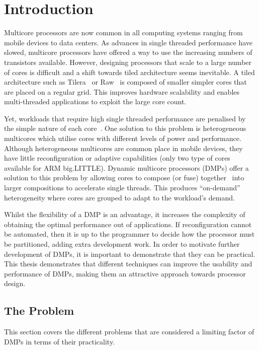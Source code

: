 \chapter{Introduction}
Multicore processors are now common in all computing systems ranging from mobile devices to data centers.
As advances in single threaded performance have slowed, multicore processors have offered a way to use the increasing numbers of transistors available.
However, designing processors that scale to a large number of cores is difficult and a shift towards tiled architecture seems inevitable.
A tiled architecture such as Tilera~\cite{bell2008tile} or Raw~\cite{waingold1997raw} is composed of smaller simpler cores that are placed on a regular grid.
This improves hardware scalability and enables multi-threaded applications to exploit the large core count.

Yet, workloads that require high single threaded performance are penalised by the simple nature of each core~\cite{eyerman2010amdahl}.
One solution to this problem is heterogeneous multicores which utilise cores with different levels of power and performance.
Although heterogeneous multicores are common place in mobile devices, they have little reconfiguration or adaptive capabilities (\eg only two type of cores available for ARM big.LITTLE).
Dynamic multicore processors (DMPs) offer a solution to this problem by allowing cores to compose (or fuse) together~\cite{ipek2007CoreFusion} into larger compositions to accelerate single threads.
This produces ``on-demand'' heterogeneity where cores are grouped to adapt to the workload's demand.

Whilst the flexibility of a DMP is an advantage, it increases the complexity of obtaining the optimal performance out of applications.
If reconfiguration cannot be automated, then it is up to the programmer to decide how the processor must be partitioned, adding extra development work.
In order to motivate further development of DMPs, it is important to demonstrate that they can be practical.
This thesis demonstrates that different techniques can improve the usability and performance of DMPs, making them an attractive approach towards processor design. 

\section{The Problem}
This section covers the different problems that are considered a limiting factor of DMPs in terms of their practicality.
